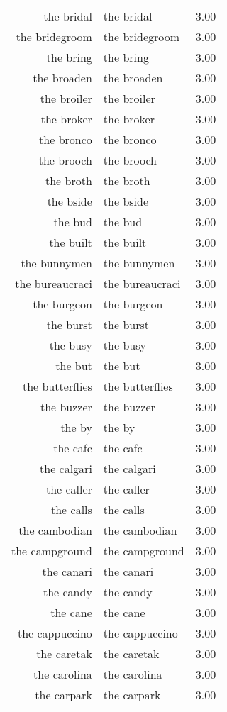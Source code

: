\begin{table}[ht]
\begin{tabular}{rlr}
  the bridal & the bridal & 3.00 \\ 
  the bridegroom & the bridegroom & 3.00 \\ 
  the bring & the bring & 3.00 \\ 
  the broaden & the broaden & 3.00 \\ 
  the broiler & the broiler & 3.00 \\ 
  the broker & the broker & 3.00 \\ 
  the bronco & the bronco & 3.00 \\ 
  the brooch & the brooch & 3.00 \\ 
  the broth & the broth & 3.00 \\ 
  the bside & the bside & 3.00 \\ 
  the bud & the bud & 3.00 \\ 
  the built & the built & 3.00 \\ 
  the bunnymen & the bunnymen & 3.00 \\ 
  the bureaucraci & the bureaucraci & 3.00 \\ 
  the burgeon & the burgeon & 3.00 \\ 
  the burst & the burst & 3.00 \\ 
  the busy & the busy & 3.00 \\ 
  the but & the but & 3.00 \\ 
  the butterflies & the butterflies & 3.00 \\ 
  the buzzer & the buzzer & 3.00 \\ 
  the by & the by & 3.00 \\ 
  the cafc & the cafc & 3.00 \\ 
  the calgari & the calgari & 3.00 \\ 
  the caller & the caller & 3.00 \\ 
  the calls & the calls & 3.00 \\ 
  the cambodian & the cambodian & 3.00 \\ 
  the campground & the campground & 3.00 \\ 
  the canari & the canari & 3.00 \\ 
  the candy & the candy & 3.00 \\ 
  the cane & the cane & 3.00 \\ 
  the cappuccino & the cappuccino & 3.00 \\ 
  the caretak & the caretak & 3.00 \\ 
  the carolina & the carolina & 3.00 \\ 
  the carpark & the carpark & 3.00 \\ 

\end{tabular}
\end{table}
